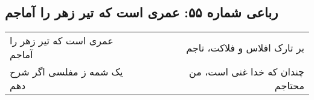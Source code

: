 \begin{center}
\section*{رباعی شماره ۵۵: عمری است که تیر زهر را آماجم}
\label{sec:055}
\begin{longtable}{l p{0.5cm} r}
عمری است که تیر زهر را آماجم
&&
بر تارک افلاس و فلاکت، تاجم
\\
یک شمه ز مفلسی اگر شرح دهم
&&
چندان که خدا غنی است، من محتاجم
\\
\end{longtable}
\end{center}

